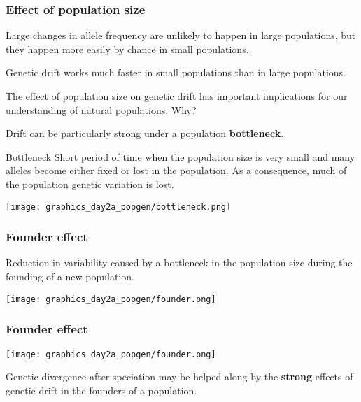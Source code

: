 \documentclass{beamer}
\newcommand{\1}{\ensuremath{\mathbf{1}}}
\begin{document}
%
%
%
\begin{frame}\frametitle{Effect of population size}
	Large changes in allele frequency are unlikely to happen in large populations, but they happen more easily by chance in small populations.\\[2ex]
	\begin{block}{}
		Genetic drift works much faster in small populations than in large populations.
	\end{block}
	\vspace{2ex}The effect of population size on genetic drift has important implications for our understanding of natural populations. Why?
\end{frame}
%
%
%
\begin{frame}
	Drift can be particularly strong under a population \textbf{bottleneck}.
	\begin{block}{Bottleneck}
		Short period of time when the population size is very small and many alleles become either fixed or lost in the population. As a consequence, much of the population genetic variation is lost.
	\end{block}
	\begin{center}
		\texttt{[image: graphics\_day2a\_popgen/bottleneck.png]}
	\end{center}
\end{frame}
%
%
%
\begin{frame}\frametitle{Founder effect}
	\begin{block}{}
		Reduction in variability caused by a bottleneck in the population size during the founding of a new population.
	\end{block}
	\begin{center}
		\texttt{[image: graphics\_day2a\_popgen/founder.png]}
	\end{center}
\end{frame}
%
%
%
\begin{frame}\frametitle{Founder effect}
	\begin{center}
		\texttt{[image: graphics\_day2a\_popgen/founder.png]}
	\end{center}
	\begin{block}{}
		Genetic divergence after speciation may be helped along by the \textbf{strong} effects of genetic drift in the founders of a population.
	\end{block}
\end{frame}
\end{document}
